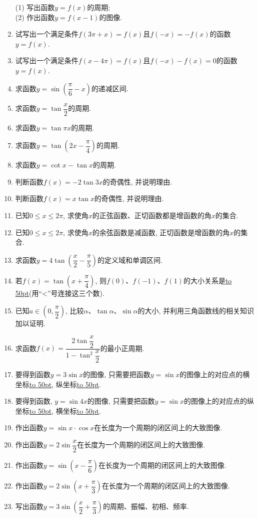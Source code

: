 \documentclass[10pt,a4paper]{article}
\newcommand{\blank}[1]{\underline{\hbox to #1pt{}}}
\begin{document}
\begin{enumerate}[1.]
\begin{center}
\begin{tikzpicture}[>=latex,scale = 0.7]
    \end{tikzpicture}
\end{center}
(1) 写出函数$y=f(x)$的周期;\\
(2) 作出函数$y=f(x-1)$的图像.
\item 试写出一个满足条件$f(3\pi +x)=f(x)$且$f(-x)=-f(x)$的函数$y=f(x)$.
\item 试写出一个满足条件$f(x-4\pi)=f(x)$且$f(-x)-f(x)=0$的函数$y=f(x)$.
\item 求函数$y=\sin (\dfrac{\pi}6-x)$的递减区间.
\item 求函数$y=\tan \dfrac x2$的周期.
\item 求函数$y=\tan \pi x$的周期.
\item 求函数$y=\tan (2x-\dfrac{\pi}4)$的周期.
\item 求函数$y=\cot x-\tan x$的周期.
\item 判断函数$f(x)=-2\tan 3x$的奇偶性, 并说明理由.
\item 判断函数$f(x)=x\tan x$的奇偶性, 并说明理由.
\item 已知$0\le x\le 2\pi$, 求使角$x$的正弦函数、正切函数都是增函数的角$x$的集合.
\item 已知$0\le x\le 2\pi$, 求使角$x$的余弦函数是减函数, 正切函数是增函数的角$x$的集合.
\item 求函数$y=4\tan (\dfrac x2-\dfrac{\pi}5)$的定义域和单调区间.
\item 若$f(x)=\tan (x+\dfrac{\pi}4)$, 则$f(0)$、$f(-1)$、$f(1)$的大小关系是\blank{50}(用``<''号连接这三个数).
\item 已知$a\in (0,\dfrac{\pi}2)$, 比较$\alpha$、$\tan \alpha$、$\sin \alpha$的大小, 并利用三角函数线的相关知识加以证明.
\item 求函数$f(x)=\dfrac{2\tan \dfrac x2}{1-\tan ^2\dfrac x2}$的最小正周期.
\item 要得到函数$y=3\sin x$的图像, 只需要把函数$y=\sin x$的图像上的对应点的横坐标\blank{50}, 纵坐标\blank{50}.
\item 要得到函数, $y=\sin 4x$的图像, 只需要把函数$y=\sin x$的图像上的对应点的纵坐标\blank{50}, 横坐标\blank{50}.
\item 作出函数$y=\sin x\cdot \cos x$在长度为一个周期的闭区间上的大致图像.
\item 作出函数$y=2\sin \dfrac x2$在长度为一个周期的闭区间上的大致图像.
\item 作出函数$y=\sin (x-\dfrac{\pi}6)$在长度为一个周期的闭区间上的大致图像.
\item 作出函数$y=2\sin (x+\dfrac{\pi}3)$在长度为一个周期的闭区间上的大致图像.
\item 写出函数$y=3\sin (\dfrac x2+\dfrac{\pi}3)$的周期、振幅、初相、频率.

\end{enumerate}
\end{document}
